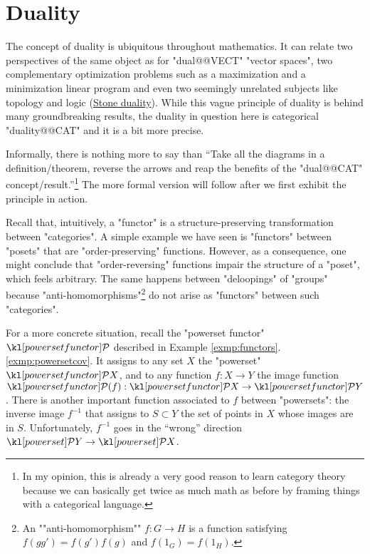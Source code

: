 \documentclass[main.tex]{subfiles}
\begin{document}
\chapter{Duality}\label{chap:duality}
The concept of duality is ubiquitous throughout mathematics. It can relate two perspectives of the same object as for "dual@@VECT" "vector spaces", two complementary optimization problems such as a maximization and a minimization linear program and even two seemingly unrelated subjects like topology and logic (\href{https://en.wikipedia.org/wiki/Stone_duality}{Stone duality}). While this vague principle of duality is behind many groundbreaking results, the duality in question here is categorical "duality@@CAT" and it is a bit more precise.%

Informally, there is nothing more to say than ``Take all the diagrams in a definition/theorem, reverse the arrows and reap the benefits of the "dual@@CAT" concept/result.''\footnote{In my opinion, this is already a very good reason to learn category theory because we can basically get twice as much math as before by framing things with a categorical language.} The more formal version will follow after we first exhibit the principle in action.

Recall that, intuitively, a "functor" is a structure-preserving transformation between "categories". A simple example we have seen is "functors" between "posets" that are "order-preserving" functions. However, as a consequence, one might conclude that "order-reversing" functions impair the structure of a "poset", which feels arbitrary. The same happens between "deloopings" of "groups" because "anti-homomorphisms"\footnote{\AP An ""anti-homomorphism"" $f: G \rightarrow H$ is a function satisfying $f(gg') = f(g')f(g)$ and $f(1_G) = f(1_H)$.} do not arise as "functors" between such "categories".

For a more concrete situation, recall the "powerset functor" $\mPcov$ described in Example \ref{exmp:functors}.\ref{exmp:powersetcov}. It assigns to any set $X$ the "powerset" $\mPcov X$, and to any function $f: X \rightarrow Y$ the image function $\mPcov(f): \mPcov X \rightarrow \mPcov Y$. There is another important function associated to $f$ between "powersets": the inverse image $f^{-1}$ that assigns to $S \subset Y$ the set of points in $X$ whose images are in $S$. Unfortunately, $f^{-1}$ goes in the ``wrong'' direction $\mP Y \rightarrow \mP X$.
\end{document}
